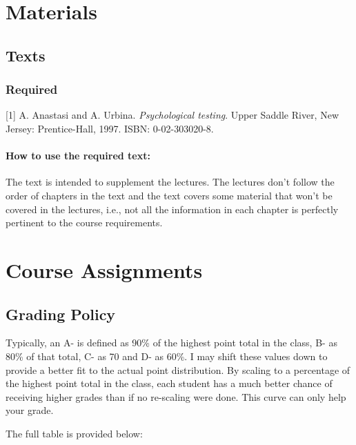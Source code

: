 \documentclass[
]{book}
\begin{document}
\section*{Materials}\label{materials-1}


\subsection*{Texts}\label{texts}


\subsubsection*{Required}\label{required}


{[}1{]} A. Anastasi and A. Urbina. \emph{Psychological testing}. Upper Saddle
River, New Jersey: Prentice-Hall, 1997. ISBN: 0-02-303020-8.

\paragraph*{How to use the required text:}\label{how-to-use-the-required-text}

The text \citep{anastasi1997} is intended to supplement the lectures. The lectures don't follow the order of chapters in the text and the text covers some material that won't be covered in the lectures, i.e., not all the information in each chapter is perfectly pertinent to the course requirements.

\section*{Course Assignments}\label{course-assignments-3}


\subsection*{Grading Policy}\label{grading-policy-3}


Typically, an A- is defined as 90\% of the highest point total in the class, B- as 80\% of that total, C- as 70 and D- as 60\%.
I may shift these values down to provide a better fit to the actual point distribution.
By scaling to a percentage of the highest point total in the class, each student has a much better chance of receiving higher grades than if no re-scaling were done.
This curve can only help your grade.

The full table is provided below:
\end{document}
